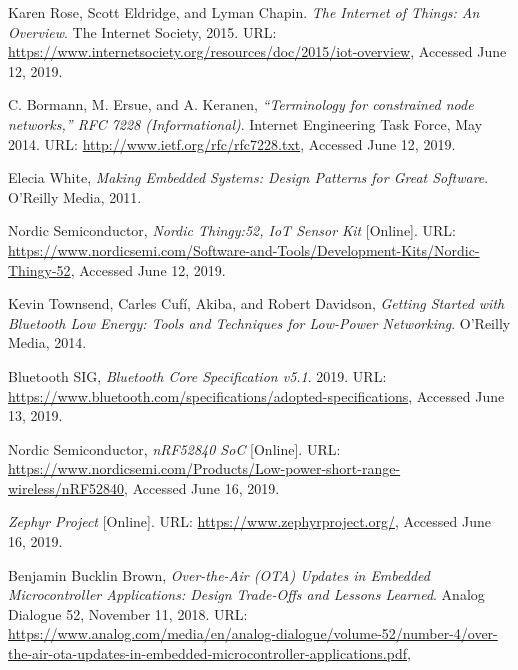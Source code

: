 \begin{thebibliography}{9}

        Karen Rose, Scott Eldridge, and Lyman Chapin.
        \textit{The Internet of Things: An Overview}.
        The Internet Society,
        2015.
        URL: \url{https://www.internetsociety.org/resources/doc/2015/iot-overview},
        Accessed June 12, 2019.

        C. Bormann, M. Ersue, and A. Keranen,
        \textit{“Terminology for constrained node networks,” RFC 7228 (Informational)}.
        Internet Engineering Task Force,
        May 2014.
        URL: \url{http://www.ietf.org/rfc/rfc7228.txt},
        Accessed June 12, 2019.

        Elecia White,
        \textit{Making Embedded Systems: Design Patterns for Great Software}.
        O'Reilly Media, 
        2011.

        Nordic Semiconductor,
        \textit{Nordic Thingy:52, IoT Sensor Kit} [Online].
        URL: \url{https://www.nordicsemi.com/Software-and-Tools/Development-Kits/Nordic-Thingy-52},
        Accessed June 12, 2019.

        Kevin Townsend, Carles Cufí, Akiba, and Robert Davidson,
        \textit{Getting Started with Bluetooth Low Energy: Tools and Techniques for Low-Power Networking}.
        O'Reilly Media, 
        2014.

        Bluetooth SIG,
        \textit{Bluetooth Core Specification v5.1}.
        2019.
        URL: \url{https://www.bluetooth.com/specifications/adopted-specifications},
        Accessed June 13, 2019.

        Nordic Semiconductor,
        \textit{nRF52840 SoC} [Online].
        URL: \url{https://www.nordicsemi.com/Products/Low-power-short-range-wireless/nRF52840},
        Accessed June 16, 2019.

        \textit{Zephyr Project} [Online].
        URL: \url{https://www.zephyrproject.org/},
        Accessed June 16, 2019.

        Benjamin Bucklin Brown,
        \textit{Over-the-Air (OTA) Updates in Embedded Microcontroller 
            Applications: Design Trade-Offs and Lessons Learned}.
        Analog Dialogue 52, 
        November 11, 2018.     
        URL: \url{https://www.analog.com/media/en/analog-dialogue/volume-52/number-4/over-the-air-ota-updates-in-embedded-microcontroller-applications.pdf},
    

\end{thebibliography}

